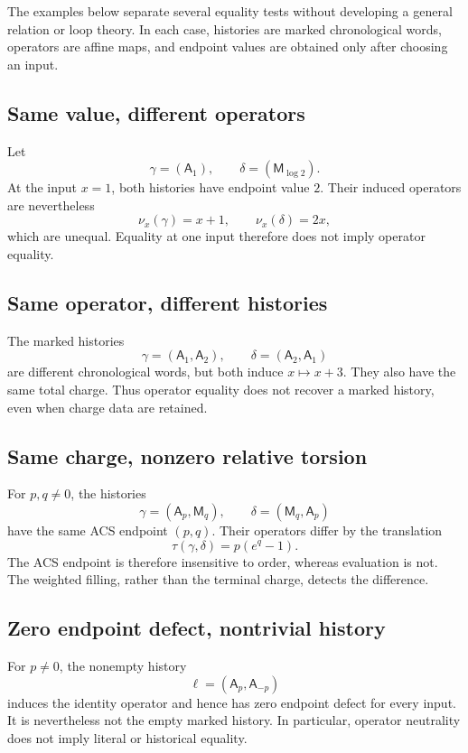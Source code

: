 The examples below separate several equality tests without developing a general
relation or loop theory.  In each case, histories are marked chronological
words, operators are affine maps, and endpoint values are obtained only after
choosing an input.

\subsection{Same value, different operators}

Let
\[
    \gamma=(\mathsf A_1),
    \qquad
    \delta=(\mathsf M_{\log 2}).
\]
At the input \(x=1\), both histories have endpoint value \(2\).  Their induced
operators are nevertheless
\[
    \nu_x(\gamma)=x+1,
    \qquad
    \nu_x(\delta)=2x,
\]
which are unequal.  Equality at one input therefore does not imply operator
equality.

\subsection{Same operator, different histories}

The marked histories
\[
    \gamma=(\mathsf A_1,\mathsf A_2),
    \qquad
    \delta=(\mathsf A_2,\mathsf A_1)
\]
are different chronological words, but both induce \(x\mapsto x+3\).  They
also have the same total charge.  Thus operator equality does not recover a
marked history, even when charge data are retained.

\subsection{Same charge, nonzero relative torsion}

For \(p,q\ne0\), the histories
\[
    \gamma=(\mathsf A_p,\mathsf M_q),
    \qquad
    \delta=(\mathsf M_q,\mathsf A_p)
\]
have the same ACS endpoint \((p,q)\).  Their operators differ by the translation
\[
    \tau(\gamma,\delta)=p(e^q-1).
\]
The ACS endpoint is therefore insensitive to order, whereas evaluation is not.
The weighted filling, rather than the terminal charge, detects the difference.

\subsection{Zero endpoint defect, nontrivial history}

For \(p\ne0\), the nonempty history
\[
    \ell=(\mathsf A_p,\mathsf A_{-p})
\]
induces the identity operator and hence has zero endpoint defect for every
input.  It is nevertheless not the empty marked history.  In particular,
operator neutrality does not imply literal or historical equality.

